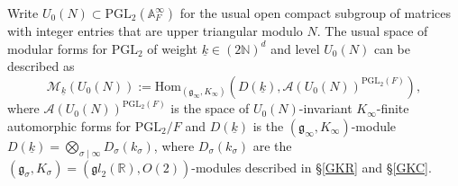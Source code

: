 \documentclass{amsart}
\theoremstyle{definition}
\theoremstyle{remark}
\numberwithin{equation}{section}
\newcommand{\ipa}[1]{\left(#1\right)}
\newcommand{\PGL}{{\mathrm{PGL}}}
\newcommand{\A}{{\mathbb A}}
\newcommand{\R}{{\mathbb R}}
\newcommand{\N}{{\mathbb N}}
\newcommand{\cA}{{\mathcal A}}
\newcommand{\cM}{{\mathcal M}}
\newcommand{\mfg}{{\mathfrak g}}
\newcommand{\mfgltwo}{{\mathfrak gl}_2}
\newcommand{\Hom}{{\mathrm {Hom}}}
\begin{document}
Write $U_0(N)\subset\PGL_2(\A_F^\infty)$ for the usual open compact subgroup of matrices with integer entries that are upper triangular modulo  $N$.
The usual space of modular forms for $\PGL_2$ of weight $\underline k\in (2\N)^d$ and level $U_0(N)$ can be described as
\begin{equation}\label{defS2}
\cM_{\underline k}(U_0(N)):=\Hom_{(\mfg_\infty,K_\infty)}\ipa{D(\underline{k}),\cA(U_0(N))^{\PGL_2(F)}},    
\end{equation}
where $\cA(U_0(N))^{\PGL_2(F)}$ is the space of $U_0(N)$-invariant $K_\infty$-finite automorphic forms for $\PGL_2/F$ and $D(\underline k)$ is the $(\mfg_\infty,K_\infty)$-module $D(\underline k)=\bigotimes_{\sigma\mid\infty}D_\sigma(k_\sigma)$, where $D_\sigma(k_\sigma)$ are the $(\mfg_\sigma,K_\sigma)=(\mfgltwo(\R),O(2))$-modules described in \S \ref{GKR} and \S \ref{GKC}.
\end{document}
